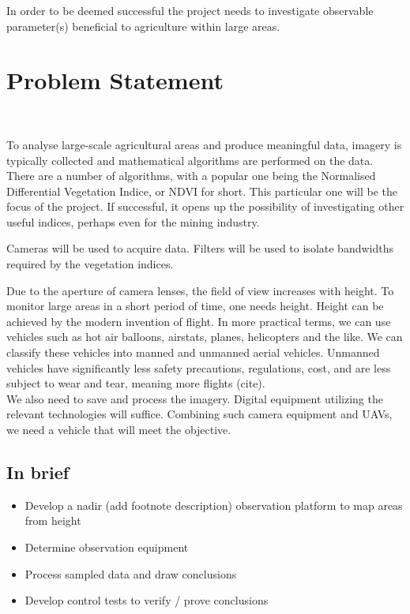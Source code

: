 \noindent
In order to be deemed successful the project needs to investigate observable parameter(s) beneficial to agriculture within large areas.

\section{Problem Statement}\

To analyse large-scale agricultural areas and produce meaningful data, imagery is typically collected and mathematical algorithms are performed on the data. There are a number of algorithms, with a popular one being the Normalised Differential Vegetation Indice, or NDVI for short. This particular one will be the focus of the project. If successful, it opens up the possibility of investigating other useful indices, perhaps even for the mining industry.

\noindent
Cameras will be used to acquire data. Filters will be used to isolate bandwidths required by the vegetation indices.

\noindent
Due to the aperture of camera lenses, the field of view increases with height. To monitor large areas in a short period of time, one needs height. Height can be achieved by the modern invention of flight. In more practical terms, we can use vehicles such as hot air balloons, airstats, planes, helicopters and the like. We can classify these vehicles into manned and unmanned aerial vehicles. Unmanned vehicles have significantly less safety precautions, regulations, cost, and are less subject to wear and tear, meaning more flights (cite).\\

\noindent
We also need to save and process the imagery. Digital equipment utilizing the relevant technologies will suffice. Combining such camera equipment and UAVs, we need a vehicle that will meet the objective.

\noindent
\subsection{In brief}
\begin{itemize}
    \item Develop a nadir (add footnote description) observation platform to map areas from height
    \item Determine observation equipment
    \item Process sampled data and draw conclusions
    \item Develop control tests to verify / prove conclusions\\
\end{itemize}

